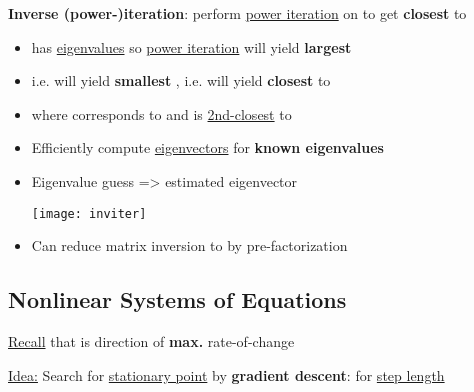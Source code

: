 \hSep %

\textbf{Inverse (power-)iteration}: perform \underline{power iteration} on
 to get  \textbf{closest} to \iMbox{\sigma}
\begin{itemize}

      \item
             has \underline{eigenvalues}
             so \underline{power iteration} will yield
            \textbf{largest }
      \item
            i.e. will yield \textbf{smallest
                  }, i.e. will yield
             \textbf{closest} to \iMbox{\sigma}
      \item
            where  corresponds to
             and  is \underline{2nd-closest} to \iMbox{\sigma}
      \item
            Efficiently compute \underline{eigenvectors} for \textbf{known eigenvalues}
            \iMbox{\sigma}
      \item
            Eigenvalue guess => estimated eigenvector

            \texttt{[image: inviter]}
      \item
            Can reduce matrix inversion  to  by
            pre-factorization
\end{itemize}


\subsection*{Nonlinear Systems of Equations}

\underline{Recall} that  is direction of \textbf{max.}
rate-of-change 

\underline{Idea:} Search for \underline{stationary point} by \textbf{gradient descent}:
for \underline{step length} \iMbox{\alpha}

\hSep %


